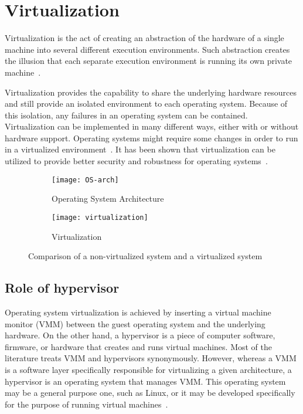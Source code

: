 \section{Virtualization}

Virtualization is the act of creating an abstraction of the hardware
of a single machine into several different execution environments. Such
abstraction creates the illusion that each separate execution environment
is running its own private machine~\cite{Galvin}.

Virtualization provides the capability to share the underlying hardware
resources and still provide an isolated environment to each operating
system. Because of this isolation, any failures in an operating
system can be contained. Virtualization can be implemented in many
different ways, either with or without hardware support. Operating
systems might require some changes in order to run in a virtualized
environment~\cite{Drepper:2008:CV:1348583.1348591}. It has been
shown that virtualization can be utilized to provide better security
and robustness for operating systems~\cite{Fraser04safehardware,
LeVasseur04UnmodifiedDriverReuse, Riley:2008:GPK:1433006.1433008}.

\begin{figure}[!ht]
    \centering
    \begin{subfigure}[b]{0.49\textwidth}
	\texttt{[image: OS-arch]}
	\caption{Operating System Architecture}
	\label{fig:OS}
    \end{subfigure}
	\hfill
    \begin{subfigure}[b]{0.49\textwidth}
	\texttt{[image: virtualization]}
	\caption{Virtualization}
	\label{fig:Virtualization}
	\end{subfigure}
    \caption{Comparison of a non-virtualized system and a virtualized system}\label{fig:Kernel space}
\end{figure}

\subsection{Role of hypervisor}
Operating system virtualization is achieved by inserting a virtual machine 
monitor (VMM) between the guest operating system and the underlying hardware. 
On the other hand, a hypervisor is a piece of computer software, firmware, or hardware
that creates and runs virtual machines.  Most of the literature treats VMM and
hypervisors synonymously. However, whereas a VMM is a software layer
specifically responsible for virtualizing a given architecture, a
hypervisor is an operating system that manages VMM. This operating
system may be a general purpose one, such as Linux, or it may
be developed specifically for the purpose of running virtual
machines~\cite{Agesen:2010:EXV:1899928.1899930}.

